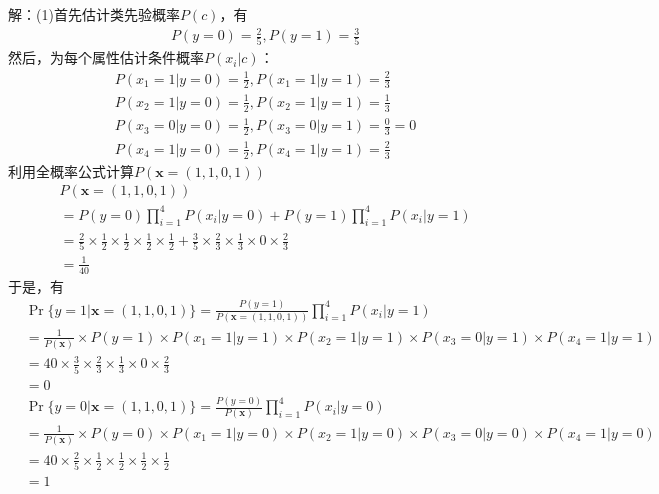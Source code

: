 \documentclass{article}
\begin{document}
	解：(1)首先估计类先验概率$P(c)$，有
	\begin{align*}
		& P(y=0)=\frac{2}{5}, P(y=1)=\frac{3}{5}
	\end{align*}
	然后，为每个属性估计条件概率$P(x_i|c)$：
	\begin{align*}
		& P(x_1=1|y=0)=\frac{1}{2}, P(x_1=1|y=1)=\frac{2}{3} \\
		& P(x_2=1|y=0)=\frac{1}{2}, P(x_2=1|y=1)=\frac{1}{3} \\
		& P(x_3=0|y=0)=\frac{1}{2}, P(x_3=0|y=1)=\frac{0}{3}=0 \\
		& P(x_4=1|y=0)=\frac{1}{2}, P(x_4=1|y=1)=\frac{2}{3}
	\end{align*}
	利用全概率公式计算$P(\mathbf{x}=(1,1,0,1))$
	\begin{align*}
		& P(\mathbf{x}=(1,1,0,1)) \\
		& =P(y=0)\prod_{i=1}^4P(x_i|y=0)+P(y=1)\prod_{i=1}^4P(x_i|y=1) \\
		& =\frac{2}{5}\times\frac{1}{2}\times\frac{1}{2}\times\frac{1}{2}\times\frac{1}{2}
		  +\frac{3}{5}\times\frac{2}{3}\times\frac{1}{3}\times 0\times\frac{2}{3} \\
		& =\frac{1}{40}
	\end{align*}
	于是，有
	\begin{align*}
		& \Pr\{y=1|\mathbf{x}=(1,1,0,1)\}
		  =\frac{P(y=1)}{P(\mathbf{x}=(1,1,0,1))}\prod_{i=1}^4P(x_i|y=1) \\
		& =\frac{1}{P(\mathbf{x})}\times P(y=1)\times 
		  P(x_1=1|y=1)\times P(x_2=1|y=1)\times P(x_3=0|y=1)\times P(x_4=1|y=1) \\
		& =40\times\frac{3}{5}\times
		  \frac{2}{3}\times\frac{1}{3}\times 0\times\frac{2}{3} \\
		& =0 \\
		& \Pr\{y=0|\mathbf{x}=(1,1,0,1)\}
		  =\frac{P(y=0)}{P(\mathbf{x})}\prod_{i=1}^4P(x_i|y=0) \\
		& =\frac{1}{P(\mathbf{x})}\times P(y=0)\times
		  P(x_1=1|y=0)\times P(x_2=1|y=0)\times P(x_3=0|y=0)\times P(x_4=1|y=0) \\
		& =40\times
		  \frac{2}{5}\times\frac{1}{2}\times\frac{1}{2}\times\frac{1}{2}\times\frac{1}{2}\\
		& =1
	\end{align*}
	
\end{document}
